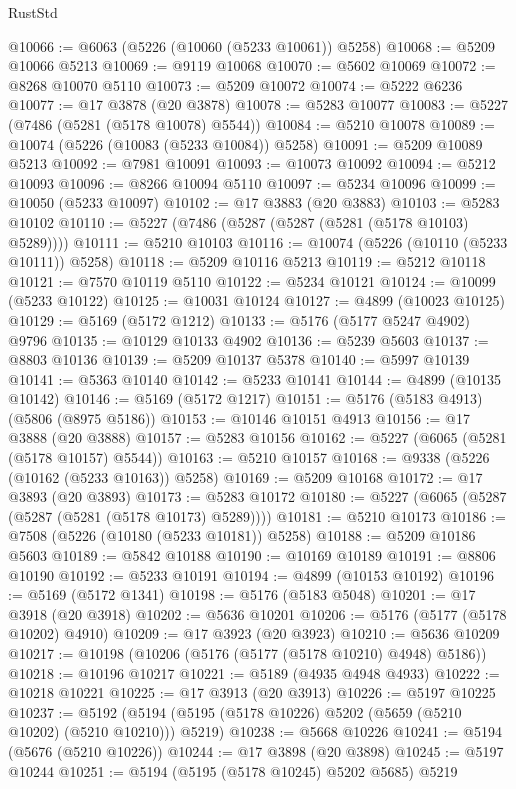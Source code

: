 \begin{lexlean}{RustStd}
\begin{coremodule}
@10066 := @6063 (@5226 (@10060 (@5233 @10061)) @5258)
@10068 := @5209 @10066 @5213
@10069 := @9119 @10068
@10070 := @5602 @10069
@10072 := @8268 @10070 @5110
@10073 := @5209 @10072
@10074 := @5222 @6236
@10077 := @17 @3878 (@20 @3878)
@10078 := @5283 @10077
@10083 := @5227 (@7486 (@5281 (@5178 @10078) @5544))
@10084 := @5210 @10078
@10089 := @10074 (@5226 (@10083 (@5233 @10084)) @5258)
@10091 := @5209 @10089 @5213
@10092 := @7981 @10091
@10093 := @10073 @10092
@10094 := @5212 @10093
@10096 := @8266 @10094 @5110
@10097 := @5234 @10096
@10099 := @10050 (@5233 @10097)
@10102 := @17 @3883 (@20 @3883)
@10103 := @5283 @10102
@10110 := @5227 (@7486 (@5287 (@5287 (@5281 (@5178 @10103) @5289))))
@10111 := @5210 @10103
@10116 := @10074 (@5226 (@10110 (@5233 @10111)) @5258)
@10118 := @5209 @10116 @5213
@10119 := @5212 @10118
@10121 := @7570 @10119 @5110
@10122 := @5234 @10121
@10124 := @10099 (@5233 @10122)
@10125 := @10031 @10124
@10127 := @4899 (@10023 @10125)
@10129 := @5169 (@5172 @1212)
@10133 := @5176 (@5177 @5247 @4902) @9796
@10135 := @10129 @10133 @4902
@10136 := @5239 @5603
@10137 := @8803 @10136
@10139 := @5209 @10137 @5378
@10140 := @5997 @10139
@10141 := @5363 @10140
@10142 := @5233 @10141
@10144 := @4899 (@10135 @10142)
@10146 := @5169 (@5172 @1217)
@10151 := @5176 (@5183 @4913) (@5806 (@8975 @5186))
@10153 := @10146 @10151 @4913
@10156 := @17 @3888 (@20 @3888)
@10157 := @5283 @10156
@10162 := @5227 (@6065 (@5281 (@5178 @10157) @5544))
@10163 := @5210 @10157
@10168 := @9338 (@5226 (@10162 (@5233 @10163)) @5258)
@10169 := @5209 @10168
@10172 := @17 @3893 (@20 @3893)
@10173 := @5283 @10172
@10180 := @5227 (@6065 (@5287 (@5287 (@5281 (@5178 @10173) @5289))))
@10181 := @5210 @10173
@10186 := @7508 (@5226 (@10180 (@5233 @10181)) @5258)
@10188 := @5209 @10186 @5603
@10189 := @5842 @10188
@10190 := @10169 @10189
@10191 := @8806 @10190
@10192 := @5233 @10191
@10194 := @4899 (@10153 @10192)
@10196 := @5169 (@5172 @1341)
@10198 := @5176 (@5183 @5048)
@10201 := @17 @3918 (@20 @3918)
@10202 := @5636 @10201
@10206 := @5176 (@5177 (@5178 @10202) @4910)
@10209 := @17 @3923 (@20 @3923)
@10210 := @5636 @10209
@10217 := @10198 (@10206 (@5176 (@5177 (@5178 @10210) @4948) @5186))
@10218 := @10196 @10217
@10221 := @5189 (@4935 @4948 @4933)
@10222 := @10218 @10221
@10225 := @17 @3913 (@20 @3913)
@10226 := @5197 @10225
@10237 := @5192 (@5194 (@5195 (@5178 @10226) @5202 (@5659 (@5210 @10202) (@5210 @10210))) @5219)
@10238 := @5668 @10226
@10241 := @5194 (@5676 (@5210 @10226))
@10244 := @17 @3898 (@20 @3898)
@10245 := @5197 @10244
@10251 := @5194 (@5195 (@5178 @10245) @5202 @5685) @5219

\end{coremodule}
\end{lexlean}
